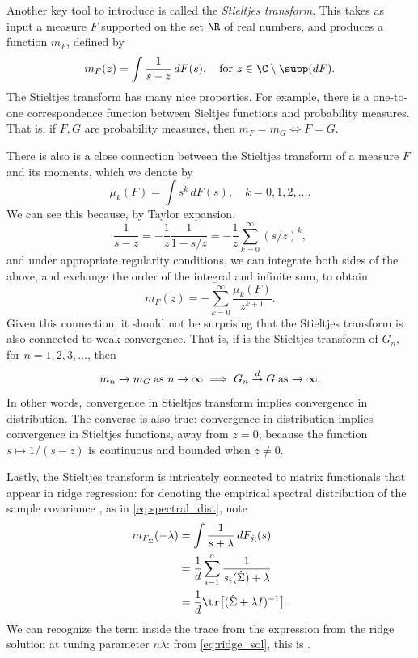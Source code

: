 \documentclass{article}
\begin{document}
Another key tool to introduce is called the \emph{Stieltjes transform}. This
takes as input a measure $F$ supported on the set $\R$ of real numbers, and 
produces a function $m_F$, defined by   
\begin{equation}
\label{eq:stieltjes}
m_F(z) = \int \frac{1}{s - z} \, dF(s), \quad \text{for $z \in \C \setminus
  \supp(dF)$}.  
\end{equation}
The Stieltjes transform has many nice properties. For example, there is a
one-to-one correspondence function between Sieltjes functions and probability
measures. That is, if $F,G$ are probability measures, then $m_F = m_G \iff F =
G$.  

There is also is a close connection between the Stieltjes transform of a measure
$F$ and its moments, which we denote by
\[
\mu_k(F) = \int s^k \, dF(s), \quad k=0,1,2,\dots.
\]
We can see this because, by Taylor expansion,
\[
\frac{1}{s - z} = -\frac{1}{z} \frac{1}{1 - s/z} = -\frac{1}{z}
\sum_{k=0}^\infty (s/z)^k, 
\]
and under appropriate regularity conditions, we can integrate both sides of the
above, and exchange the order of the integral and infinite sum, to obtain 
\[
m_F(z) = - \sum_{k=0}^\infty \frac{\mu_k(F)}{z^{k+1}}. 
\]
Given this connection, it should not be surprising that the Stieltjes
transform is also connected to weak convergence. That is, if  is the Stieltjes transform of $G_n$, for $n=1,2,3,\dots$, then  
\[
m_n \to m_G \; \text{as $n \to \infty$} \implies G_n \overset{d}{\to} G \; \text{as $\to
  \infty$}.  
\]
In other words, convergence in Stieltjes transform implies convergence in 
distribution. The converse is also true: convergence in distribution implies
convergence in Stieltjes functions, away from $z=0$, because the function $s
\mapsto 1/(s-z)$ is continuous and bounded when $z \not= 0$.     

Lastly, the Stieltjes transform is intricately connected to matrix functionals
that appear in ridge regression: for  denoting the
empirical spectral distribution of the sample covariance , as in \eqref{eq:spectral_dist}, note 
\begin{align*}
m_{F_{\hSigma}}(-\lambda) 
&= \int \frac{1}{s+\lambda} \, dF_{\hSigma} (s) \\
&= \frac{1}{d} \sum_{i=1}^n \frac{1}{s_i(\hSigma) + \lambda} \\ 
&= \frac{1}{d} \tr\big[ (\hSigma + \lambda I)^{-1} \big].
\end{align*}
We can recognize the term inside the trace from the expression from the ridge
solution at tuning parameter $n\lambda$: from \eqref{eq:ridge_sol}, this is
.
\end{document}
